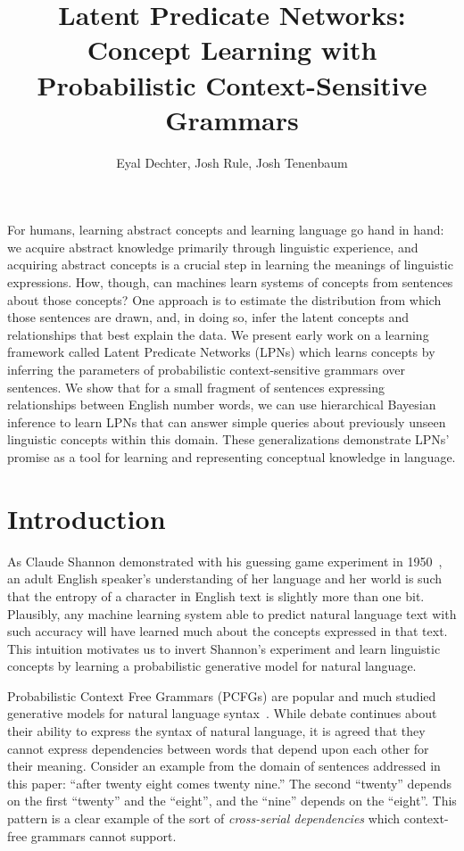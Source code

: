 \documentclass[11pt, twocolumn]{article}
\title{Latent Predicate Networks: Concept Learning with Probabilistic Context-Sensitive Grammars}
\author{Eyal Dechter,  Josh Rule, Josh Tenenbaum}
\begin{document}
\vspace{-10cm}
\maketitle

{\small For humans, learning abstract concepts and learning language
  go hand in hand: we acquire abstract knowledge primarily through
  linguistic experience, and acquiring abstract concepts is a crucial
  step in learning the meanings of linguistic expressions. How,
  though, can machines learn systems of concepts from sentences about
  those concepts? One approach is to estimate the distribution from
  which those sentences are drawn, and, in doing so, infer the latent
  concepts and relationships that best explain the data. We present
  early work on a learning framework called Latent Predicate Networks
  (LPNs) which learns concepts by inferring the parameters of
  probabilistic context-sensitive grammars over sentences.  We show
  that for a small fragment of sentences expressing relationships
  between English number words, we can use hierarchical Bayesian
  inference to learn LPNs that can answer simple queries about
  previously unseen linguistic concepts within this domain. These
  generalizations demonstrate LPNs' promise as a tool for learning and
  representing conceptual knowledge in language.}

\section{Introduction}

As Claude Shannon demonstrated with his guessing game experiment in
1950~\cite{Shannon1950}, an adult English speaker's understanding of
her language and her world is such that the entropy of a character in
English text is slightly more than one bit. Plausibly, any machine
learning system able to predict natural language text with such
accuracy will have learned much about the concepts expressed in that
text. This intuition motivates us to invert Shannon's experiment and
learn linguistic concepts by learning a probabilistic generative model
for natural language.

Probabilistic Context Free Grammars (PCFGs) are popular and much
studied generative models for natural language
syntax~\cite{Someone}. While debate continues about their ability to
express the syntax of natural language, it is agreed that they cannot
express dependencies between words that depend upon each other for
their meaning. Consider an example from the domain of sentences
addressed in this paper: ``after twenty eight comes twenty nine.''
The second ``twenty'' depends on the first ``twenty'' and the
``eight'', and the ``nine'' depends on the ``eight''. This pattern is
a clear example of the sort of \emph{cross-serial dependencies} which
context-free grammars cannot support.
\end{document}
